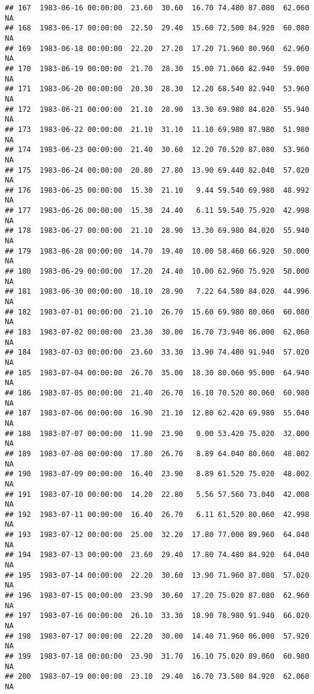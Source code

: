 \documentclass{article}\usepackage{graphicx, color}
\makeatletter
\newenvironment{kframe}{%
 \def\at@end@of@kframe{}%
 \ifinner\ifhmode%
  \def\at@end@of@kframe{\end{minipage}}%
  \begin{minipage}{\columnwidth}%
 \fi\fi%
 \def\FrameCommand##1{\hskip\@totalleftmargin \hskip-\fboxsep
 \colorbox{shadecolor}{##1}\hskip-\fboxsep
     \hskip-\linewidth \hskip-\@totalleftmargin \hskip\columnwidth}%
 \MakeFramed {\advance\hsize-\width
   \@totalleftmargin\z@ \linewidth\hsize
   \@setminipage}}%
 {\par\unskip\endMakeFramed%
 \at@end@of@kframe}
\newenvironment{knitrout}{}{} %
\makeatother
\begin{document}
\begin{knitrout}
\begin{kframe}
\begin{verbatim}
## 167  1983-06-16 00:00:00  23.60  30.60  16.70 74.480 87.080  62.060     NA
## 168  1983-06-17 00:00:00  22.50  29.40  15.60 72.500 84.920  60.080     NA
## 169  1983-06-18 00:00:00  22.20  27.20  17.20 71.960 80.960  62.960     NA
## 170  1983-06-19 00:00:00  21.70  28.30  15.00 71.060 82.940  59.000     NA
## 171  1983-06-20 00:00:00  20.30  28.30  12.20 68.540 82.940  53.960     NA
## 172  1983-06-21 00:00:00  21.10  28.90  13.30 69.980 84.020  55.940     NA
## 173  1983-06-22 00:00:00  21.10  31.10  11.10 69.980 87.980  51.980     NA
## 174  1983-06-23 00:00:00  21.40  30.60  12.20 70.520 87.080  53.960     NA
## 175  1983-06-24 00:00:00  20.80  27.80  13.90 69.440 82.040  57.020     NA
## 176  1983-06-25 00:00:00  15.30  21.10   9.44 59.540 69.980  48.992     NA
## 177  1983-06-26 00:00:00  15.30  24.40   6.11 59.540 75.920  42.998     NA
## 178  1983-06-27 00:00:00  21.10  28.90  13.30 69.980 84.020  55.940     NA
## 179  1983-06-28 00:00:00  14.70  19.40  10.00 58.460 66.920  50.000     NA
## 180  1983-06-29 00:00:00  17.20  24.40  10.00 62.960 75.920  50.000     NA
## 181  1983-06-30 00:00:00  18.10  28.90   7.22 64.580 84.020  44.996     NA
## 182  1983-07-01 00:00:00  21.10  26.70  15.60 69.980 80.060  60.080     NA
## 183  1983-07-02 00:00:00  23.30  30.00  16.70 73.940 86.000  62.060     NA
## 184  1983-07-03 00:00:00  23.60  33.30  13.90 74.480 91.940  57.020     NA
## 185  1983-07-04 00:00:00  26.70  35.00  18.30 80.060 95.000  64.940     NA
## 186  1983-07-05 00:00:00  21.40  26.70  16.10 70.520 80.060  60.980     NA
## 187  1983-07-06 00:00:00  16.90  21.10  12.80 62.420 69.980  55.040     NA
## 188  1983-07-07 00:00:00  11.90  23.90   0.00 53.420 75.020  32.000     NA
## 189  1983-07-08 00:00:00  17.80  26.70   8.89 64.040 80.060  48.002     NA
## 190  1983-07-09 00:00:00  16.40  23.90   8.89 61.520 75.020  48.002     NA
## 191  1983-07-10 00:00:00  14.20  22.80   5.56 57.560 73.040  42.008     NA
## 192  1983-07-11 00:00:00  16.40  26.70   6.11 61.520 80.060  42.998     NA
## 193  1983-07-12 00:00:00  25.00  32.20  17.80 77.000 89.960  64.040     NA
## 194  1983-07-13 00:00:00  23.60  29.40  17.80 74.480 84.920  64.040     NA
## 195  1983-07-14 00:00:00  22.20  30.60  13.90 71.960 87.080  57.020     NA
## 196  1983-07-15 00:00:00  23.90  30.60  17.20 75.020 87.080  62.960     NA
## 197  1983-07-16 00:00:00  26.10  33.30  18.90 78.980 91.940  66.020     NA
## 198  1983-07-17 00:00:00  22.20  30.00  14.40 71.960 86.000  57.920     NA
## 199  1983-07-18 00:00:00  23.90  31.70  16.10 75.020 89.060  60.980     NA
## 200  1983-07-19 00:00:00  23.10  29.40  16.70 73.580 84.920  62.060     NA

\end{verbatim}
\end{kframe}
\end{knitrout}
\end{document}
